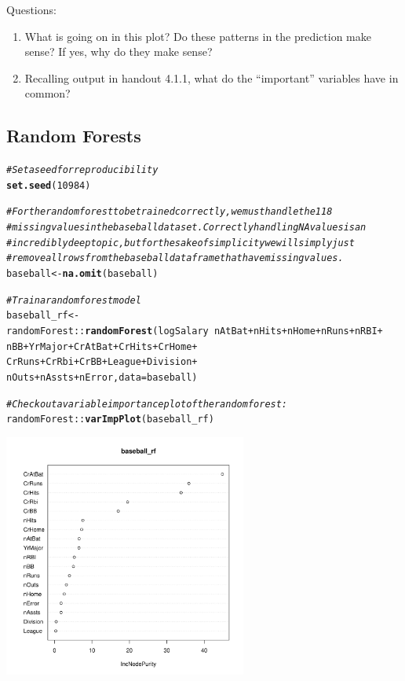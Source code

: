 \documentclass{article}\usepackage[]{graphicx}\usepackage[]{color}
\makeatletter
\newcommand{\hlnum}[1]{\textcolor[rgb]{0.686,0.059,0.569}{#1}}%
\newcommand{\hlcom}[1]{\textcolor[rgb]{0.678,0.584,0.686}{\textit{#1}}}%
\newcommand{\hlopt}[1]{\textcolor[rgb]{0,0,0}{#1}}%
\newcommand{\hlstd}[1]{\textcolor[rgb]{0.345,0.345,0.345}{#1}}%
\newcommand{\hlkwb}[1]{\textcolor[rgb]{0.69,0.353,0.396}{#1}}%
\newcommand{\hlkwc}[1]{\textcolor[rgb]{0.333,0.667,0.333}{#1}}%
\newcommand{\hlkwd}[1]{\textcolor[rgb]{0.737,0.353,0.396}{\textbf{#1}}}%
\newenvironment{kframe}{%
 \def\at@end@of@kframe{}%
 \ifinner\ifhmode%
  \def\at@end@of@kframe{\end{minipage}}%
  \begin{minipage}{\columnwidth}%
 \fi\fi%
 \def\FrameCommand##1{\hskip\@totalleftmargin \hskip-\fboxsep
 \colorbox{shadecolor}{##1}\hskip-\fboxsep
     \hskip-\linewidth \hskip-\@totalleftmargin \hskip\columnwidth}%
 \MakeFramed {\advance\hsize-\width
   \@totalleftmargin\z@ \linewidth\hsize
   \@setminipage}}%
 {\par\unskip\endMakeFramed%
 \at@end@of@kframe}
\newenvironment{knitrout}{}{} %
\makeatother
\begin{document}
Questions:
\begin{enumerate}
  \item What is going on in this plot? Do these patterns in the prediction make sense? If yes, why do they make sense?
  \item Recalling output in handout 4.1.1, what do the ``important'' variables have in common?
\end{enumerate}

\newpage

\subsection*{Random Forests}

\begin{knitrout}
\color{fgcolor}\begin{kframe}
\begin{alltt}
\hlcom{# Set a seed for reproducibility}
\hlkwd{set.seed}\hlstd{(}\hlnum{10984}\hlstd{)}

\hlcom{# For the random forest to be trained correctly, we must handle the 118}
\hlcom{# missing values in the baseball dataset. Correctly handling NA values is an}
\hlcom{# incredibly deep topic, but for the sake of simplicity we will simply just}
\hlcom{# remove all rows from the baseball dataframe that have missing values.}
\hlstd{baseball} \hlkwb{<-} \hlkwd{na.omit}\hlstd{(baseball)}

\hlcom{# Train a random forest model}
\hlstd{baseball_rf} \hlkwb{<-}
  \hlstd{randomForest}\hlopt{::}\hlkwd{randomForest}\hlstd{(logSalary} \hlopt{~} \hlstd{nAtBat} \hlopt{+} \hlstd{nHits} \hlopt{+} \hlstd{nHome} \hlopt{+} \hlstd{nRuns} \hlopt{+} \hlstd{nRBI} \hlopt{+}
                               \hlstd{nBB} \hlopt{+} \hlstd{YrMajor} \hlopt{+} \hlstd{CrAtBat} \hlopt{+} \hlstd{CrHits} \hlopt{+} \hlstd{CrHome} \hlopt{+}
                               \hlstd{CrRuns} \hlopt{+} \hlstd{CrRbi} \hlopt{+} \hlstd{CrBB} \hlopt{+} \hlstd{League} \hlopt{+} \hlstd{Division} \hlopt{+}
                               \hlstd{nOuts} \hlopt{+} \hlstd{nAssts} \hlopt{+} \hlstd{nError,} \hlkwc{data} \hlstd{= baseball)}

\hlcom{# Check out a variable importance plot of the random forest:}
\hlstd{randomForest}\hlopt{::}\hlkwd{varImpPlot}\hlstd{(baseball_rf)}
\end{alltt}
\end{kframe}

{\centering \includegraphics[width=0.6\textwidth]{figure/unnamed-chunk-7-1} 

}



\end{knitrout}
\end{document}
